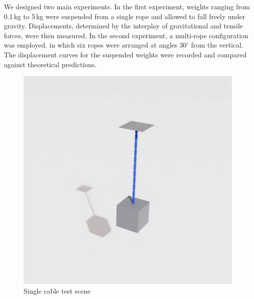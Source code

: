 \documentclass[12pt,twoside,letterpaper]{article}
\begin{document}
We designed two main experiments. In the first experiment, weights ranging from 0.1\,kg to 5\,kg were suspended from a single rope and allowed to fall freely under gravity.
Displacements, determined by the interplay of gravitational and tensile forces, were then measured.
In the second experiment, a multi-rope configuration was employed, in which six ropes were arranged at angles 30\(^\circ\)  from the vertical.
The displacement curves for the suspended weights were recorded and compared against theoretical predictions.

\begin{figure}[ht]
    \centering
    \begin{minipage}[t]{0.49\linewidth}
        \centering
        \includegraphics[width=\linewidth]{figures/single_test.jpg}
        \caption{Single cable test scene}
        \label{fig:single_test}
    \end{minipage}
    \hfill
    \begin{minipage}[t]{0.49\linewidth}
        \centering

\end{minipage}
\end{figure}
\end{document}
